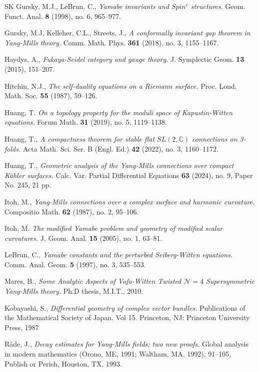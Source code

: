 \documentclass[12pt, twoside]{article}
\theoremstyle{definition}
\numberwithin{equation}{section}
\begin{document}
\begin{thebibliography}{SK}
Gursky, M.J., LeBrun, C.,
\textit{Yamabe invariants and $Spin^{c}$ structures.}
Geom. Funct. Anal. \textbf{8} (1998), no. 6, 965--977. 


Gursky, M.J, Kelleher, C.L., Streets, J.,
\textit{A conformally invariant gap theorem in Yang-Mills theory.}
Comm. Math. Phys. \textbf{361} (2018), no. 3, 1155--1167. 	
	
Haydys, A.,
\textit{Fukaya-Seidel category and gauge theory.}
J. Symplectic Geom. \textbf{13} (2015), 151--207. 

Hitchin, N.J.,
\textit{The self-duality equations on a Riemann surface.}
Proc. Lond. Math. Soc. \textbf{55} (1987), 59--126.

Huang, T.
\textit{On a topology property for the moduli space of Kapustin-Witten equations.}
Forum Math. \textbf{31} (2019), no. 5, 1119--1138. 

Huang, T.,
\textit{A compactness theorem for stable flat $SL(2,\mathbb{C})$ connections on 3-folds.} Acta Math. Sci. Ser. B (Engl. Ed.) \textbf{42} (2022), no. 3, 1160--1172.

Huang, T.,
\textit{Geometric analysis of the Yang-Mills connections over compact Kähler surfaces.}
Calc. Var. Partial Differential Equations \textbf{63} (2024), no. 9, Paper No. 245, 21 pp. 

Itoh, M., 
\textit{Yang-Mills connections over a complex surface and harmonic curvature.} 
Compositio Math. \textbf{62} (1987), no. 2, 95--106. 

Itoh, M.
\textit{The modified Yamabe problem and geometry of modified scalar curvatures.}
J. Geom. Anal. \textbf{15} (2005), no. 1, 63--81. 

LeBrun, C.,
\textit{Yamabe constants and the perturbed Seiberg-Witten equations.}
Comm. Anal. Geom. \textbf{5} (1997), no. 3, 535--553. 

Mares, B., 
\textit {Some Analytic Aspects of Vafa-Witten Twisted $\mathcal{N}=4$ Supersymmetric Yang-Mills theory.}
{Ph.D thesis,} {M.I.T.}, 2010.	

Kobayashi, S.,
\textit{Differential geometry of complex vector bundles.} Publications of the Mathematical Society of Japan. Vol 15. Princeton, NJ: Princeton University Press, 1987 

Råde, J.,
\textit{Decay estimates for Yang-Mills fields; two new proofs.} Global analysis in modern mathematics (Orono, ME, 1991; Waltham, MA, 1992), 91--105, Publish or Perish, Houston, TX, 1993. 


\end{thebibliography}
\end{document}
